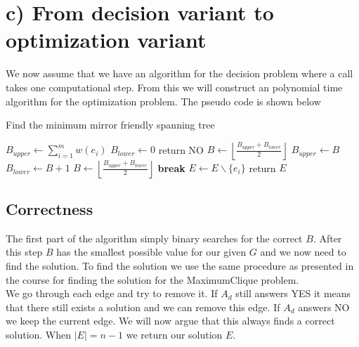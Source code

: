 \section*{c) From decision variant to optimization variant}

We now assume that we have an algorithm for the decision problem where a call takes one computational step. From this we will construct an polynomial time algorithm for the optimization problem. The pseudo code is shown below

\begin{algorithm}[H]
\caption{Find the minimum mirror friendly spanning tree}\label{alg:spP}
\begin{algorithmic}
\State $B_{upper} \leftarrow \sum_{i=1}^m w(e_i)$
\State $B_{lower} \leftarrow 0$
    \State return NO
\EndIf
\State $B \leftarrow \left\lfloor{\frac{B_{upper} + B_{lower}}{2}} \right\rfloor $
        \State $B_{upper} \leftarrow B$
    \Else
        \State $B_{lower} \leftarrow B+1$
    \EndIf
    \State $B \leftarrow \left\lfloor{\frac{B_{upper} + B_{lower}}{2}}\right\rfloor$
        \State \textbf{break}
    \EndIf
\EndWhile
{}
        \State $E \leftarrow E \backslash \{e_i\}$ 
    \EndIf
        \State return $E$
    \EndIf
\EndFor
\end{algorithmic}
\end{algorithm}

\subsection*{Correctness}
The first part of the algorithm simply binary searches for the correct $B$. After this step $B$ has the smallest possible value for our given $G$ and we now need to find the solution. To find the solution we use the same procedure as presented in the course for finding the solution for the MaximumClique problem.\\
We go through each edge and try to remove it. If $A_d$ still answers YES it means that there still exists a solution and we can remove this edge. If $A_d$ answers NO we keep the current edge. We will now argue that this always finds a correct solution. When $|E| = n-1$ we return our solution $E$. 
